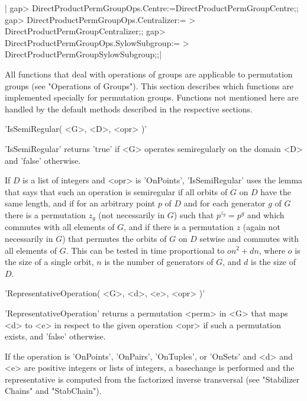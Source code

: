 |    gap> DirectProductPermGroupOps.Centre:=DirectProductPermGroupCentre;;
    gap> DirectProductPermGroupOps.Centralizer:=
    >    DirectProductPermGroupCentralizer;;
    gap> DirectProductPermGroupOps.SylowSubgroup:=
    >    DirectProductPermGroupSylowSubgroup;;|


All  functions  that deal  with  operations  of  groups are applicable to
permutation groups (see "Operations of Groups").  This section  describes
which  functions  are  implemented  specially  for   permutation  groups.
Functions not mentioned here are handled by the default methods described
in the respective sections.

\vspace{5mm}
'IsSemiRegular( <G>, <D>, <opr> )'%

'IsSemiRegular'  returns  'true'  if <G>  operates  semiregularly on  the
domain <D> and 'false' otherwise.

If $D$ is  a  list of integers and <opr>  is 'OnPoints',  'IsSemiRegular'
uses the lemma  that  says that such an operation  is semiregular if  all
orbits of $G$  on $D$ have the same length, and if for an arbitrary point
$p$ of $D$ and for each generator $g$ of $G$ there is a permutation $z_g$
(not  necessarily in  $G$) such  that $p^{z_g}  = p^g$ and which commutes
with all elements  of $G$, and if  there is  a permutation $z$ (again not
necessarily in $G$) that  permutes the orbits of $G$ on  $D$  setwise and
commutes  with  all  elements  of  $G$.   This  can  be  tested  in  time
proportional to $o n^2 + d n$, where $o$ is the size  of a  single orbit,
$n$ is the number of generators of $G$, and $d$ is the size of $D$.

\vspace{5mm}
'RepresentativeOperation( <G>, <d>, <e>, <opr> )'%

'RepresentativeOperation' returns  a  permutation <perm> in <G> that maps
<d> to <e> in respect to the given operation  <opr> if such a permutation
exists, and 'false' otherwise.

If the  operation is 'OnPoints',  'OnPairs', 'OnTuples', or  'OnSets' and
<d> and <e> are  positive integers or lists  of integers, a basechange is
performed and the representative is computed  from the factorized inverse
transversal (see "Stabilizer Chains" and "StabChain").

